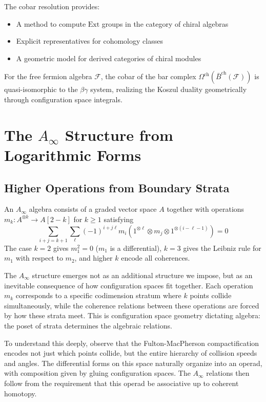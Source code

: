 \begin{remark}
The cobar resolution provides:
\begin{itemize}
\item A method to compute $\text{Ext}$ groups in the category of chiral algebras
\item Explicit representatives for cohomology classes
\item A geometric model for derived categories of chiral modules
\end{itemize}
\end{remark}

\begin{example}
For the free fermion algebra $\mathcal{F}$, the cobar of the bar complex $\Omega^{\text{ch}}(\bar{B}^{\text{ch}}(\mathcal{F}))$ is quasi-isomorphic to the $\beta\gamma$ system, realizing the Koszul duality geometrically through configuration space integrals.
\end{example}
 
\section{The $A_\infty$ Structure from Logarithmic Forms}
 
\subsection{Higher Operations from Boundary Strata}

\begin{definition}\label{def:a-infinity}
An $A_\infty$ algebra consists of a graded vector space $A$
together with operations $m_k: A^{\otimes k} \to A[2-k]$ for $k \geq 1$ satisfying
\[\sum_{i+j=k+1} \sum_{\ell} (-1)^{i+j\ell} m_i(1^{\otimes \ell} \otimes m_j \otimes 1^{\otimes(i-\ell-1)}) = 0\]
The case $k=2$ gives $m_1^2 = 0$ ($m_1$ is a differential), $k=3$ gives the Leibniz rule for $m_1$ with
respect to $m_2$, and higher $k$ encode all coherences.
\end{definition}


\begin{remark}
The $A_\infty$ structure emerges not as an additional structure we impose, but as an inevitable consequence of how configuration spaces fit together. Each operation $m_k$ corresponds to a specific codimension stratum where $k$ points collide simultaneously, while the coherence relations between these operations are forced by how these strata meet. This is configuration space geometry dictating algebra: the poset of strata determines the algebraic relations.

To understand this deeply, observe that the Fulton-MacPherson compactification encodes not just which points collide, but the entire hierarchy of collision speeds and angles. The differential forms on this space naturally organize into an operad, with composition given by gluing configuration spaces. The $A_\infty$ relations then follow from the requirement that this operad be associative up to coherent homotopy.
\end{remark}


